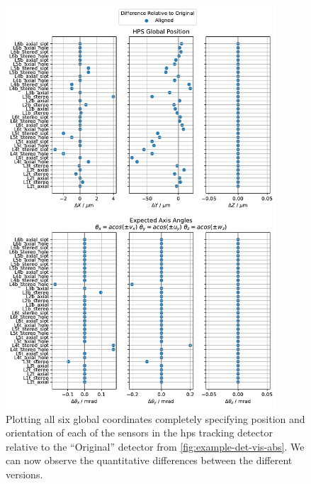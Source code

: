 \begin{figure}
  \centering
  \includegraphics[width=0.9\textwidth]{figures/hps/alignment/example-det-vis-diff.pdf}
  \caption{Plotting all six global coordinates completely specifying position and
    orientation of each of the sensors in the \ac{hps} tracking detector relative to
    the ``Original'' detector from \cref{fig:example-det-vis-abs}. We can now observe
    the quantitative differences between the different versions.}
  \label{fig:example-det-vis-diff}
\end{figure}

